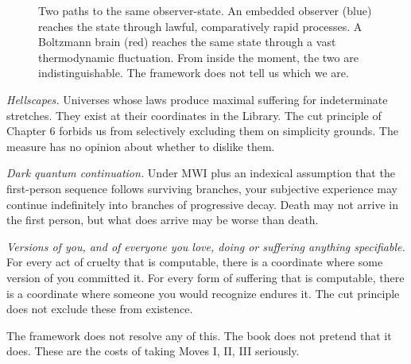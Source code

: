 \begin{figure}[h]
\centering
{}
\caption{Two paths to the same observer-state. An embedded observer (blue) reaches the state through lawful, comparatively rapid processes. A Boltzmann brain (red) reaches the same state through a vast thermodynamic fluctuation. From inside the moment, the two are indistinguishable. The framework does not tell us which we are.}
\label{fig:boltzmann-brain}
\end{figure}

\emph{Hellscapes.} Universes whose laws produce maximal suffering for indeterminate stretches. They exist at their coordinates in the Library. The cut principle of Chapter 6 forbids us from selectively excluding them on simplicity grounds. The measure has no opinion about whether to dislike them.

\emph{Dark quantum continuation.} Under MWI plus an indexical assumption that the first-person sequence follows surviving branches, your subjective experience may continue indefinitely into branches of progressive decay. Death may not arrive in the first person, but what does arrive may be worse than death.

\emph{Versions of you, and of everyone you love, doing or suffering anything specifiable.} For every act of cruelty that is computable, there is a coordinate where some version of you committed it. For every form of suffering that is computable, there is a coordinate where someone you would recognize endures it. The cut principle does not exclude these from existence.

The framework does not resolve any of this. The book does not pretend that it does. These are the costs of taking Moves I, II, III seriously.

